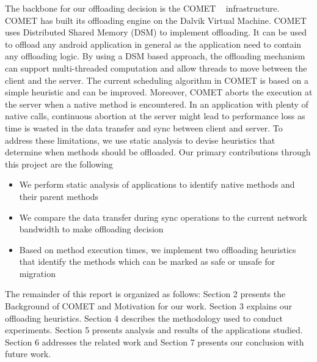 The backbone for our offloading decision is the COMET ~\cite{comet} infrastructure. COMET has built its offloading engine
on the Dalvik Virtual Machine. COMET uses Distributed Shared Memory (DSM) to implement offloading. It can be used to offload
any android application in general as the application need to contain any offloading logic. By using a DSM based approach, the
offloading mechanism can support multi-threaded computation and allow threads to move between the client and the server.
The current scheduling algorithm in COMET is based on a simple heuristic and can be improved. Moreover, COMET aborts the
execution at the server when a native method is encountered. In an application with plenty of native calls, continuous abortion
at the server might lead to performance loss as time is wasted in the data transfer and sync between client and server.
To address these limitations, we use static analysis to devise heuristics that determine when methods should be offloaded.
\newline
\newline
Our primary contributions through this project are the following
\begin{itemize}
   \item We perform static analysis of applications to identify native methods and their parent methods
   \item We compare the data transfer during sync operations to the current network bandwidth to make offloading decision
   \item Based on method execution times, we implement two offloading heuristics that identify the methods which can be marked
   as safe or unsafe for migration
\end{itemize}
\vspace{2mm}
The remainder of this report is organized as follows: Section 2 presents the Background of COMET and Motivation for our work.
Section 3 explains our offloading heuristics. Section 4 describes the methodology used to conduct experiments. Section 5 presents
analysis and results of the applications studied. Section 6 addresses the related work and Section 7 presents our conclusion with
future work.

